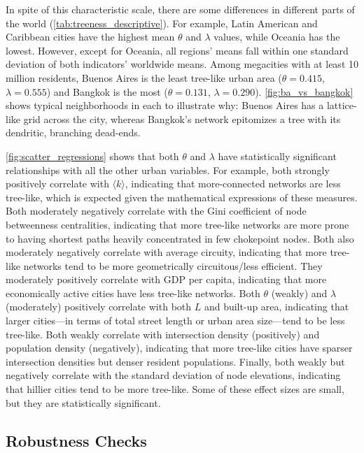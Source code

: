 \documentclass[12pt,letterpaper]{article} %
\begin{document}
In spite of this characteristic scale, there are some differences in different parts of the world (\autoref{tab:treeness_descriptive}). For example, Latin American and Caribbean cities have the highest mean $\theta$ and $\lambda$ values, while Oceania has the lowest. However, except for Oceania, all regions' means fall within one standard deviation of both indicators' worldwide means. Among megacities with at least 10 million residents, Buenos Aires is the least tree-like urban area ($\theta=0.415$, $\lambda=0.555$) and Bangkok is the most ($\theta=0.131$, $\lambda=0.290$). \autoref{fig:ba_vs_bangkok} shows typical neighborhoods in each to illustrate why: Buenos Aires has a lattice-like grid across the city, whereas Bangkok's network epitomizes a tree with its dendritic, branching dead-ends.

\autoref{fig:scatter_regressions} shows that both $\theta$ and $\lambda$ have statistically significant relationships with all the other urban variables. For example, both strongly positively correlate with $\langle k \rangle$, indicating that more-connected networks are less tree-like, which is expected given the mathematical expressions of these measures. Both moderately negatively correlate with the Gini coefficient of node betweenness centralities, indicating that more tree-like networks are more prone to having shortest paths heavily concentrated in few chokepoint nodes. Both also moderately negatively correlate with average circuity, indicating that more tree-like networks tend to be more geometrically circuitous/less efficient. They moderately positively correlate with GDP per capita, indicating that more economically active cities have less tree-like networks. Both $\theta$ (weakly) and $\lambda$ (moderately) positively correlate with both $L$ and built-up area, indicating that larger cities---in terms of total street length or urban area size---tend to be less tree-like. Both weakly correlate with intersection density (positively) and population density (negatively), indicating that more tree-like cities have sparser intersection densities but denser resident populations. Finally, both weakly but negatively correlate with the standard deviation of node elevations, indicating that hillier cities tend to be more tree-like. Some of these effect sizes are small, but they are statistically significant.

\subsection{Robustness Checks}
\end{document}
